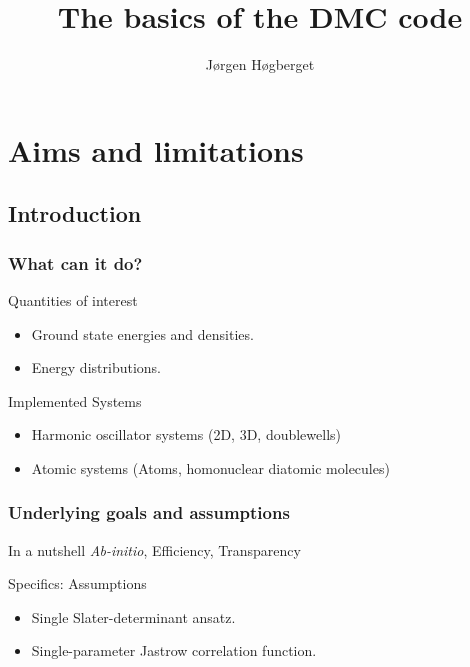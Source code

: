 \documentclass{beamer}
\begin{document}
\title{The basics of the DMC code}
\author{Jørgen Høgberget}
\date{} 

\begin{frame}
\titlepage
\end{frame}



\section{Aims and limitations} 
\subsection{Introduction}

\begin{frame}\frametitle{What can it do?} 

\begin{alertblock}{Quantities of interest}
\begin{itemize}
 \item Ground state energies and densities.
 \item Energy distributions.
\end{itemize}
\end{alertblock}

\pause
\begin{alertblock}{Implemented Systems}
\begin{itemize}
\item Harmonic oscillator systems (2D, 3D, doublewells)
\item Atomic systems (Atoms, homonuclear diatomic molecules)
\end{itemize}
\end{alertblock}

\end{frame}

\begin{frame}\frametitle{Underlying goals and assumptions}

\begin{alertblock}{In a nutshell}
 \textit{Ab-initio}, Efficiency, Transparency
\end{alertblock}

\pause

\begin{alertblock}{Specifics: Assumptions}
\begin{itemize}
 \item Single Slater-determinant ansatz.
 \item Single-parameter Jastrow correlation function.
\end{itemize}
\end{alertblock}

\end{frame}
\end{document}

